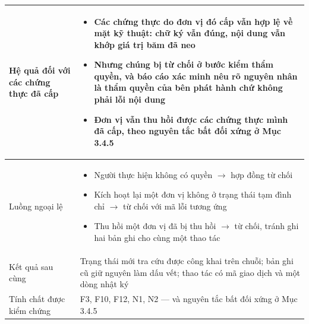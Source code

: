 \begin{longtable}{|p{3.4cm}|p{10.3cm}|}
Hệ quả đối với các chứng thực đã cấp &
\begin{itemize}[leftmargin=*, nosep]
    \item Các chứng thực do đơn vị đó cấp \textbf{vẫn hợp lệ về mặt kỹ thuật}: chữ ký vẫn đúng, nội dung vẫn khớp giá trị băm đã neo
    \item Nhưng chúng \textbf{bị từ chối ở bước kiểm thẩm quyền}, và báo cáo xác minh nêu rõ nguyên nhân là thẩm quyền của bên phát hành chứ không phải lỗi nội dung
    \item Đơn vị \textbf{vẫn thu hồi được} các chứng thực mình đã cấp, theo nguyên tắc bất đối xứng ở Mục 3.4.5
\end{itemize} \\
\hline

Luồng ngoại lệ &
\begin{itemize}[leftmargin=*, nosep]
    \item Người thực hiện không có quyền $\rightarrow$ hợp đồng từ chối
    \item Kích hoạt lại một đơn vị không ở trạng thái tạm đình chỉ $\rightarrow$ từ chối với mã lỗi tương ứng
    \item Thu hồi một đơn vị đã bị thu hồi $\rightarrow$ từ chối, tránh ghi hai bản ghi cho cùng một thao tác
\end{itemize} \\
\hline

Kết quả sau cùng &
Trạng thái mới tra cứu được công khai trên chuỗi; bản ghi cũ giữ nguyên làm dấu vết; thao tác có mã giao dịch và một dòng nhật ký \\
\hline

Tính chất được kiểm chứng &
F3, F10, F12, N1, N2 --- và nguyên tắc bất đối xứng ở Mục 3.4.5 \\
\hline

\end{longtable}
